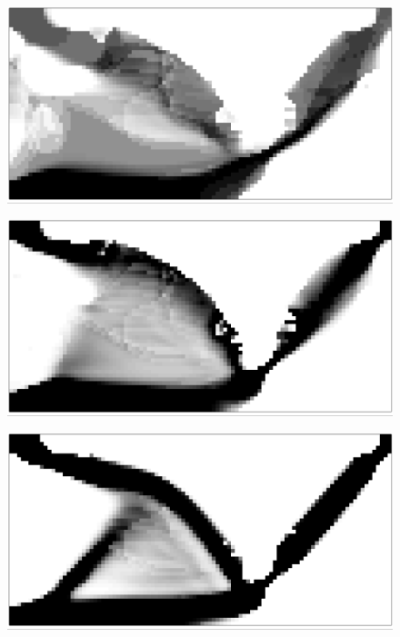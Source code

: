  \hspace{0.2cm}
 \begin{subfigure}[t]{0.24\columnwidth} %
     \centering
		   \includegraphics[width=\textwidth]{images/chap5/Inverter_evo_03.png} %
 \end{subfigure}
 \medbreak
 \begin{subfigure}[t]{0.24\columnwidth} %
     \centering
		   \includegraphics[width=\textwidth]{images/chap5/Inverter_evo_04.png} %
 \end{subfigure}
 \hspace{0.2cm}
 \begin{subfigure}[t]{0.25\columnwidth} %
     \centering
		   \includegraphics[width=\textwidth]{images/chap5/Inverter_evo_05.png} %
 \end{subfigure}
